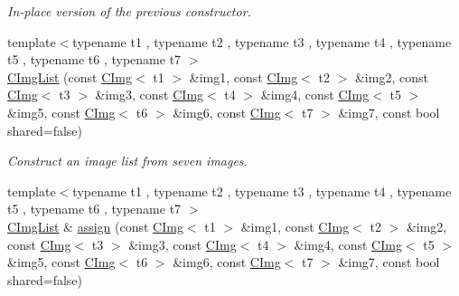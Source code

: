 \begin{DoxyCompactItemize}
\begin{DoxyCompactList}\small\item\em In-\/place version of the previous constructor. \end{DoxyCompactList}\item 
\hypertarget{structcimg__library_1_1_c_img_list_a76e5c12bff2a47ec57a0cee38c954be8}{{\footnotesize template$<$typename t1 , typename t2 , typename t3 , typename t4 , typename t5 , typename t6 , typename t7 $>$ }\\\hyperlink{structcimg__library_1_1_c_img_list_a76e5c12bff2a47ec57a0cee38c954be8}{C\-Img\-List} (const \hyperlink{structcimg__library_1_1_c_img}{C\-Img}$<$ t1 $>$ \&img1, const \hyperlink{structcimg__library_1_1_c_img}{C\-Img}$<$ t2 $>$ \&img2, const \hyperlink{structcimg__library_1_1_c_img}{C\-Img}$<$ t3 $>$ \&img3, const \hyperlink{structcimg__library_1_1_c_img}{C\-Img}$<$ t4 $>$ \&img4, const \hyperlink{structcimg__library_1_1_c_img}{C\-Img}$<$ t5 $>$ \&img5, const \hyperlink{structcimg__library_1_1_c_img}{C\-Img}$<$ t6 $>$ \&img6, const \hyperlink{structcimg__library_1_1_c_img}{C\-Img}$<$ t7 $>$ \&img7, const bool shared=false)}\label{structcimg__library_1_1_c_img_list_a76e5c12bff2a47ec57a0cee38c954be8}

\begin{DoxyCompactList}\small\item\em Construct an image list from seven images. \end{DoxyCompactList}\item 
\hypertarget{structcimg__library_1_1_c_img_list_a84635fe08c2fa9da5ccc58736c6af89e}{{\footnotesize template$<$typename t1 , typename t2 , typename t3 , typename t4 , typename t5 , typename t6 , typename t7 $>$ }\\\hyperlink{structcimg__library_1_1_c_img_list}{C\-Img\-List} \& \hyperlink{structcimg__library_1_1_c_img_list_a84635fe08c2fa9da5ccc58736c6af89e}{assign} (const \hyperlink{structcimg__library_1_1_c_img}{C\-Img}$<$ t1 $>$ \&img1, const \hyperlink{structcimg__library_1_1_c_img}{C\-Img}$<$ t2 $>$ \&img2, const \hyperlink{structcimg__library_1_1_c_img}{C\-Img}$<$ t3 $>$ \&img3, const \hyperlink{structcimg__library_1_1_c_img}{C\-Img}$<$ t4 $>$ \&img4, const \hyperlink{structcimg__library_1_1_c_img}{C\-Img}$<$ t5 $>$ \&img5, const \hyperlink{structcimg__library_1_1_c_img}{C\-Img}$<$ t6 $>$ \&img6, const \hyperlink{structcimg__library_1_1_c_img}{C\-Img}$<$ t7 $>$ \&img7, const bool shared=false)}\label{structcimg__library_1_1_c_img_list_a84635fe08c2fa9da5ccc58736c6af89e}


\end{DoxyCompactItemize}
